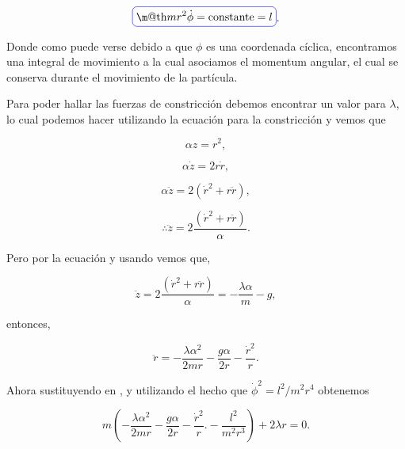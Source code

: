 \documentclass[a4paper,10pt]{article}
\makeatletter
\numberwithin{equation}{section}
\newcommand*{\boxcolor}{blue}
\renewcommand{\boxed}[1]{\textcolor{\boxcolor}{%
\tikz[baseline={([yshift=-1ex]current bounding box.center)}] \node [rectangle, minimum width=1ex,rounded corners,draw] {\normalcolor\m@th$\displaystyle#1$};}}
\makeatother
\begin{document}
\begin{equation}
 \boxed{mr^2\dot{\phi} = \text{constante} = l}.
 \label{eq:ecuMovimientoPhi}
\end{equation}

Donde como puede verse debido a que $\phi$ es una coordenada cíclica, encontramos 
una integral de movimiento a la cual asociamos el momentum angular, el cual se 
conserva durante el movimiento de la partícula.

\vspace{.3cm}

Para poder hallar las fuerzas de constricción debemos encontrar un valor para 
$\lambda$, lo cual podemos hacer utilizando la ecuación para la constricción 
 y vemos que 

\begin{equation}
 \alpha z = r^2,
\end{equation}

\begin{equation}
\alpha \dot{z} = 2r \dot{r},
\end{equation}

\begin{equation}
\alpha \ddot{z} = 2(\dot{r}^2 + r\ddot{r}),
\end{equation}

\begin{equation}
 \therefore \ddot{z} = 2 \frac{(\dot{r}^2 + r\ddot{r})}{\alpha}.
 \label{eq:derivConstriccionParab}
\end{equation}

Pero por la ecuación  y usando 
vemos que,

\begin{equation}
 \ddot{z} = 2 \frac{(\dot{r}^2 + r\ddot{r})}{\alpha} = - \frac{\lambda \alpha}{m} - g,
\end{equation}

entonces,

\begin{equation}
 \ddot{r} = - \frac{\lambda \alpha^2}{2mr} - \frac{g\alpha}{2r} - \frac{\dot{r}^2}{r}.
\label{eq:doblederivR}
\end{equation}

Ahora sustituyendo  en , y utilizando 
el hecho que $\dot{\phi}^2 = l^2/m^2r^4$ obtenemos

\begin{equation}
 m(- \frac{\lambda \alpha^2}{2mr} - \frac{g\alpha}{2r} - \frac{\dot{r}^2}{r}.
 - \frac{l^2}{m^2r^3}) + 2\lambda r = 0.
\end{equation}
\end{document}
